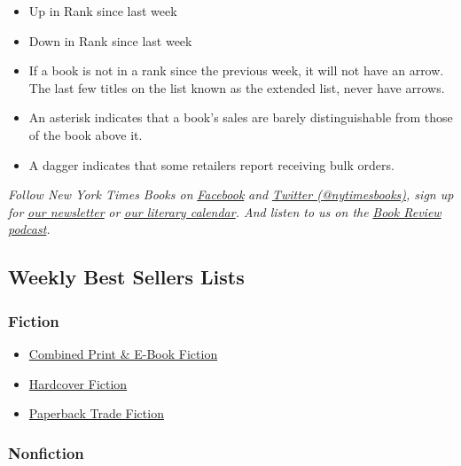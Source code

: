 \begin{itemize}
\item
  Up in Rank since last week
\item
  Down in Rank since last week
\item
  If a book is not in a rank since the previous week, it will not have
  an arrow. The last few titles on the list known as the extended list,
  never have arrows.
\item
  An asterisk indicates that a book's sales are barely distinguishable
  from those of the book above it.
\item
  A dagger indicates that some retailers report receiving bulk orders.
\end{itemize}

\emph{Follow New York Times Books on}
\href{https://www.facebookcorewwwi.onion/nytbooks/}{\emph{Facebook}}
\emph{and} \href{https://twitter.com/nytimesbooks}{\emph{Twitter
(@nytimesbooks)}}\emph{, sign up for}
\href{https://www.nytimes3xbfgragh.onion/newsletters/books-review}{\emph{our
newsletter}} \emph{or}
\href{https://www.nytimes3xbfgragh.onion/interactive/2017/books/books-calendar.html}{\emph{our
literary calendar}}\emph{. And listen to us on the}
\href{https://www.nytimes3xbfgragh.onion/column/book-review-podcast}{\emph{Book
Review podcast}}\emph{.}

\hypertarget{weekly-best-sellers-lists}{%
\subsection{Weekly Best Sellers Lists}\label{weekly-best-sellers-lists}}

\hypertarget{fiction}{%
\subsubsection{Fiction}\label{fiction}}

\begin{itemize}
\tightlist
\item
  \href{/books/best-sellers/combined-print-and-e-book-fiction/}{Combined
  Print \& E-Book Fiction}
\item
  \href{/books/best-sellers/hardcover-fiction/}{Hardcover Fiction}
\item
  \href{/books/best-sellers/trade-fiction-paperback/}{Paperback Trade
  Fiction}
\end{itemize}

\hypertarget{nonfiction}{%
\subsubsection{Nonfiction}\label{nonfiction}}

